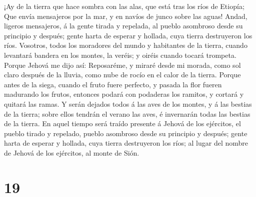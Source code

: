  ¡Ay de la tierra que hace sombra con las alas, que está
tras los ríos de Etiopía;  Que envía mensajeros por la
mar, y en navíos de junco sobre las aguas! Andad, ligeros mensajeros, á
la gente tirada y repelada, al pueblo asombroso desde su principio y
después; gente harta de esperar y hollada, cuya tierra destruyeron los
ríos.  Vosotros, todos los moradores del mundo y
habitantes de la tierra, cuando levantará bandera en los montes, la
veréis; y oiréis cuando tocará trompeta.  Porque Jehová me
dijo así: Reposaréme, y miraré desde mi morada, como sol claro después
de la lluvia, como nube de rocío en el calor de la tierra.
 Porque antes de la siega, cuando el fruto fuere perfecto,
y pasada la flor fueren madurando los frutos, entonces podará con
podaderas los ramitos, y cortará y quitará las ramas.  Y
serán dejados todos á las aves de los montes, y á las bestias de la
tierra; sobre ellos tendrán el verano las aves, é invernarán todas las
bestias de la tierra.  En aquel tiempo será traído
presente á Jehová de los ejércitos, el pueblo tirado y repelado, pueblo
asombroso desde su principio y después; gente harta de esperar y
hollada, cuya tierra destruyeron los ríos; al lugar del nombre de Jehová
de los ejércitos, al monte de Sión.

\hypertarget{section-18}{%
\section{19}\label{section-18}}

